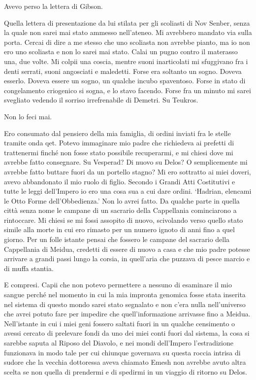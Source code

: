 Avevo perso la lettera di Gibson.

Quella lettera di presentazione da lui stilata per gli scoliasti di Nov
Senber, senza la quale non sarei mai stato ammesso nell'ateneo. Mi
avrebbero mandato via sulla porta. Cercai di dire a me stesso che uno
scoliasta non avrebbe pianto, ma io non ero uno scoliasta e non lo sarei
mai stato. Calai un pugno contro il materasso una, due volte. Mi colpii
una coscia, mentre suoni inarticolati mi sfuggivano fra i denti serrati,
suoni angosciati e maledetti. Forse era soltanto un sogno. Doveva
esserlo. Doveva essere un sogno, un qualche incubo spaventoso. Forse in
stato di congelamento criogenico si sogna, e lo stavo facendo. Forse fra
un minuto mi sarei svegliato vedendo il sorriso irrefrenabile di
Demetri. Su Teukros.

Non lo feci mai.

Ero consumato dal pensiero della mia famiglia, di ordini inviati fra le
stelle tramite onda \foreignlanguage{italian}{qet}. Potevo immaginare
mio padre che richiedeva ai prefetti di trattenermi finché non fosse
stato possibile recuperarmi, e mi chiesi dove mi avrebbe fatto
consegnare. Su Vesperad? Di nuovo su Delos? O semplicemente mi avrebbe
fatto buttare fuori da un portello stagno? Mi ero sottratto ai miei
doveri, avevo abbandonato il mio ruolo di figlio. Secondo i Grandi Atti
Costitutivi e tutte le leggi dell'Impero io ero una cosa sua a cui dare
ordini. `Hadrian, elencami le Otto Forme dell'Obbedienza.' Non lo avrei
fatto. Da qualche parte in quella città senza nome le campane di un
sacrario della Cappellania cominciarono a rintoccare. Mi chiesi se mi
fossi assopito di nuovo, scivolando verso quello stato simile alla morte
in cui ero rimasto per un numero ignoto di anni fino a quel giorno. Per
un folle istante pensai che fossero le campane del sacrario della
Cappellania di Meidua, credetti di essere di nuovo a casa e che mio
padre potesse arrivare a grandi passi lungo la corsia, in quell'aria che
puzzava di pesce marcio e di muffa stantia.

E compresi. Capii che non potevo permettere a nessuno di esaminare il
mio sangue perché nel momento in cui la mia impronta genomica fosse
stata inserita nel sistema di questo mondo sarei stato segnalato e non
c'era nulla nell'universo che avrei potuto fare per impedire che
quell'informazione arrivasse fino a Meidua. Nell'istante in cui i miei
geni fossero saltati fuori in un qualche censimento o avessi cercato di
prelevare fondi da uno dei miei conti fuori dal sistema, la cosa si
sarebbe saputa al Riposo del Diavolo, e nei mondi dell'Impero
l'estradizione funzionava in modo tale per cui chiunque governava su
questa roccia intrisa di sudore che la vecchia dottoressa aveva chiamato
Emesh non avrebbe avuto altra scelta se non quella di prendermi e di
spedirmi in un viaggio di ritorno su Delos.

